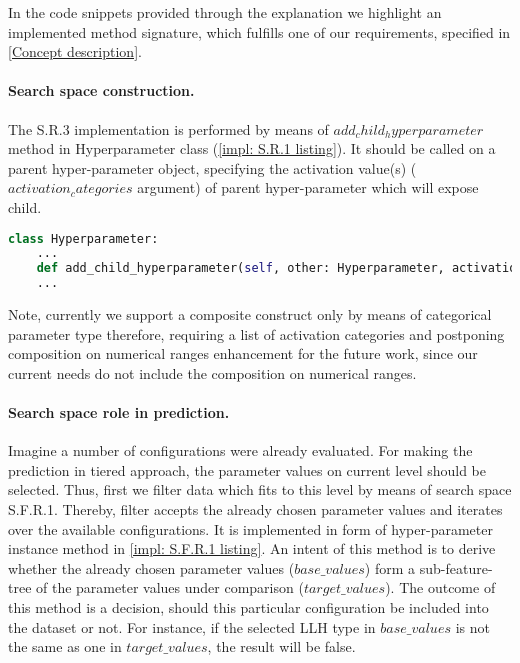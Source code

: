 In the code snippets provided through the explanation we highlight an implemented method  signature, which fulfills one of our requirements, specified in \cref{Concept description}.

\paragraph{Search space construction.} The S.R.3 implementation is performed by means of $add_child_hyperparameter$ method in Hyperparameter class (\cref{impl: S.R.1 listing}). It should be called on a parent hyper-parameter object, specifying the activation value(s) ($activation_categories$ argument) of parent hyper-parameter which will expose child. 

\begin{lstlisting}[language=Python, caption=S.R.1 implementation., label=impl: S.R.1 listing]
class Hyperparameter:
	...
	def add_child_hyperparameter(self, other: Hyperparameter, activation_categories: Iterable[_CATEGORY]) -> Hyperparameter: pass
	...
\end{lstlisting}

Note, currently we support a composite construct only by means of categorical parameter type therefore, requiring a list of activation categories and postponing composition on numerical ranges enhancement for the future work, since our current needs do not include the composition on numerical ranges.

\paragraph{Search space role in prediction.}
Imagine a number of configurations were already evaluated. For making the prediction in tiered approach, the parameter values on current level should be selected. Thus, first we filter data which fits to this level by means of search space S.F.R.1. Thereby, filter accepts the already chosen parameter values and iterates over the available configurations. It is implemented in form of hyper-parameter instance method in \cref{impl: S.F.R.1 listing}.
An intent of this method is to derive whether the already chosen parameter values ($base\_values$) form a sub-feature-tree of the parameter values under comparison ($target\_values$). The outcome of this method is a decision, should this particular configuration be included into the dataset or not. For instance, if the selected LLH type in $base\_values$ is not the same as one in $target\_values$, the result will be false.

